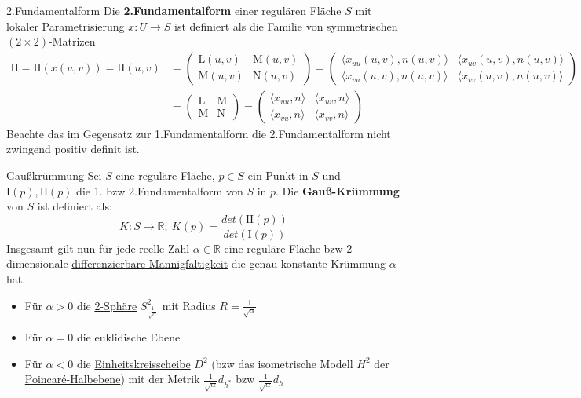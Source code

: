 \begin{titleDef}{2.Fundamentalform}
\label{fundamentalzweite}
Die \textbf{2.Fundamentalform} einer regulären Fläche $S$ mit lokaler Parametrisierung $x:U\to S$ ist definiert als die Familie von symmetrischen $(2\times 2)$-Matrizen
\begin{align*}
	\mathrm{II}=\mathrm{II}(x(u,v))=\mathrm{II}(u,v) &= 
	\begin{pmatrix} 
		\mathrm{L}(u,v) & \mathrm{M}(u,v)\\
		\mathrm{M}(u,v) & \mathrm{N}(u,v)
	\end{pmatrix} = 
	\begin{pmatrix} 
		\langle x_{uu}(u,v),n(u,v)\rangle & \langle x_{uv}(u,v),n(u,v)\rangle\\
		\langle x_{vu}(u,v),n(u,v)\rangle & \langle x_{vv}(u,v),n(u,v)\rangle
	\end{pmatrix} 
	\\
	&= \begin{pmatrix} 
		\mathrm{L} & \mathrm{M}\\
		\mathrm{M} & \mathrm{N}
	\end{pmatrix} =
	\begin{pmatrix} 
		\langle x_{uu},n\rangle & \langle x_{uv},n\rangle\\
		\langle x_{vu},n\rangle & \langle x_{vv},n\rangle
	\end{pmatrix}
\end{align*}
Beachte das im Gegensatz zur 1.Fundamentalform die 2.Fundamentalform nicht zwingend positiv definit ist.
\end{titleDef}

\begin{titleDef}{Gaußkrümmung}
\label{gausskruemmung}
Sei $S$ eine reguläre Fläche, $p\in S$ ein Punkt in $S$ und $\mathrm{I}(p),\mathrm{II}(p)$ die 1. bzw 2.Fundamentalform von $S$ in $p$. Die \textbf{Gauß-Krümmung} von $S$ ist definiert als:
$$K:S\to\mathbb{R};\: K(p)=\frac{det(\mathrm{II}(p))}{det(\mathrm{I}(p))}$$
Insgesamt gilt nun für jede reelle Zahl $\alpha\in\mathbb{R}$ eine \hyperref[regFlaeche]{reguläre Fläche} bzw 2-dimensionale \hyperref[diffMannigfaltigkeit]{differenzierbare Mannigfaltigkeit} die genau konstante Krümmung $\alpha$ hat.
\begin{itemize}
	\item Für $\alpha>0$ die \hyperref[ndimsphere]{2-Sphäre} $S_{\frac{1}{\sqrt{\alpha}}}^2$ mit Radius $R=\frac{1}{\sqrt{\alpha}}$
	\item Für $\alpha=0$ die euklidische Ebene
	\item Für $\alpha<0$ die \hyperref[hyperEinheitskreis]{Einheitskreisscheibe} $D^2$ (bzw das isometrische Modell $H^2$ der \hyperref[hyperbolischpoincare]{Poincaré-Halbebene}) mit der Metrik $\frac{1}{\sqrt{\alpha}}d_{h^*}$ bzw $\frac{1}{\sqrt{\alpha}}d_{h}$
\end{itemize}
\end{titleDef}

